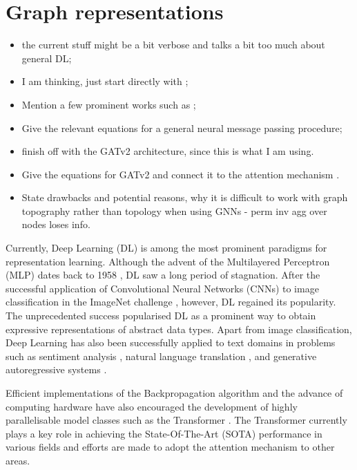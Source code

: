 \documentclass{report}
\numberwithin{equation}{section}
\numberwithin{figure}{section}
\numberwithin{table}{section}
\numberwithin{algorithm}{section}
\begin{document}
\section{Graph representations}\label{sec:GNNs}
\begin{itemize}
  \item the current stuff might be a bit verbose and talks 
  a bit too much about general DL; 
  \item I am thinking, just start directly with \cite{ScarselliGNN};
  \item Mention a few prominent works such as \cite{MPNNs,GCN};
  \item Give the relevant equations for a general neural message 
  passing procedure;
  \item finish off with the GATv2 \citep{GATv2} architecture, 
  since this is what I am using.
  \item Give the equations for GATv2 and connect it to the 
  attention mechanism \citep{transformers}.
  \item State drawbacks and potential reasons, why it is difficult 
    to work with graph topography rather than topology when using 
    GNNs - perm inv agg over nodes loses info.
\end{itemize}
Currently, Deep Learning (DL) is among the most prominent paradigms 
for representation learning. Although the advent of the 
Multilayered Perceptron (MLP) dates back to 
1958 \citep{perceptron}, DL saw a long period 
of stagnation. After the successful application of 
Convolutional Neural 
Networks (CNNs) \citep{CNNsLecun} to image classification
in the ImageNet challenge 
\citep{alexnet,imagenet}, however, DL regained 
its popularity. The unprecedented success 
popularised DL as a prominent way 
to obtain expressive representations of abstract data types. 
Apart from image classification, 
Deep Learning has also been successfully 
applied to text domains in problems such as 
sentiment analysis \citep{SentimentRNN,textCNN,BERT},  
natural language translation \citep{nlpTranslation},
and generative autoregressive systems \citep{GPT,GPT2020}.

Efficient implementations \citep{PyTorch,tensorflow} 
of the Backpropagation algorithm \citep{backprop} and the 
advance of computing 
hardware have also encouraged the development of highly parallelisable 
model classes such as the Transformer \citep{transformers}. The 
Transformer currently plays a key role in achieving the 
State-Of-The-Art (SOTA) performance 
in various fields and efforts are made to adopt the attention 
mechanism to other areas.
\end{document}
